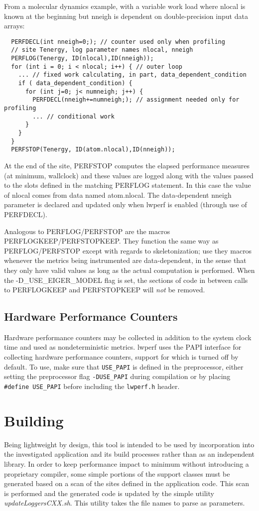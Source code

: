 \documentclass{article}
\begin{document}
From a molecular dynamics example, with a variable work load where nlocal is known at the beginning but nneigh is dependent on double-precision input data arrays:
\begin{verbatim}
  PERFDECL(int nneigh=0;); // counter used only when profiling
  // site Tenergy, log parameter names nlocal, nneigh
  PERFLOG(Tenergy, ID(nlocal),ID(nneigh)); 
  for (int i = 0; i < nlocal; i++) { // outer loop
    ... // fixed work calculating, in part, data_dependent_condition
    if ( data_dependent_condition) {
      for (int j=0; j< numneigh; j++) {
        PERFDECL(nneigh+=numneigh;); // assignment needed only for profiling
        ... // conditional work
      }
    }
  }
  PERFSTOP(Tenergy, ID(atom.nlocal),ID(nneigh));
\end{verbatim}

At the end of the site, PERFSTOP computes the elapsed performance measures (at minimum, wallclock) and these values are logged along with the values passed to the slots defined in the matching PERFLOG statement. In this case the value of nlocal comes from data named atom.nlocal. The data-dependent nneigh parameter is declared and updated only when lwperf is enabled (through use of PERFDECL).

Analogous to PERFLOG/PERFSTOP are the macros PERFLOGKEEP/PERFSTOPKEEP. They function the same way as PERFLOG/PERFSTOP except with regards to skeletonization; use they macros whenever the metrics being instrumented are data-dependent, in the sense that they only have valid values as long as the actual computation is performed. When the -D\_USE\_EIGER\_MODEL flag is set, the sections of code in between calls to PERFLOGKEEP and PERFSTOPKEEP will \textit{not} be removed.

\subsection{Hardware Performance Counters}
Hardware performance counters may be collected in addition to the system clock time and used as nondeterministic metrics. lwperf uses the PAPI interface for collecting hardware performance counters, support for which is turned off by default. To use, make sure that \texttt{USE\_PAPI} is defined in the preprocessor, either setting the preprocessor flag \texttt{-DUSE\_PAPI} during compilation or by placing \texttt{#define USE\_PAPI} before including the \texttt{lwperf.h} header.

\section{Building}
Being lightweight by design, this tool is intended to be used by incorporation into the investigated application and its build processes rather than as an independent library.  In order to keep performance impact to minimum without introducing a proprietary compiler, some simple portions of the support classes must be generated based on a scan of the sites defined in the application code. This scan is performed and the generated code is updated by the simple utility {\em updateLoggersCXX.sh}. This utility takes the file names to parse as parameters.
\end{document}
